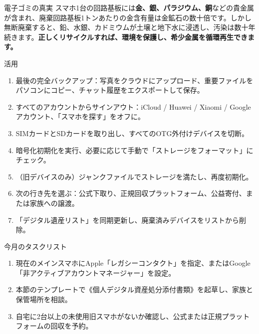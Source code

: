\begin{tcbinfo}{電子ゴミの真実}
スマホ1台の回路基板には\textbf{金、銀、パラジウム、銅}などの貴金属が含まれ、廃棄回路基板1トンあたりの金含有量は金鉱石の数十倍です。しかし無断廃棄すると、鉛、水銀、カドミウムが土壌と地下水に浸透し、汚染は数十年続きます。\textbf{正しくリサイクルすれば、環境を保護し、希少金属を循環再生できます。}

\end{tcbinfo}

\begin{tcbpractice}{活用}
\begin{enumerate}
  \item 最後の完全バックアップ：写真をクラウドにアップロード、重要ファイルをパソコンにコピー、チャット履歴をエクスポートして保存。
  \item すべてのアカウントからサインアウト：iCloud / Huawei / Xiaomi / Googleアカウント、「スマホを探す」をオフに。
  \item SIMカードとSDカードを取り出し、すべてのOTG外付けデバイスを切断。
  \item 暗号化初期化を実行、必要に応じて手動で「ストレージをフォーマット」にチェック。
  \item （旧デバイスのみ）ジャンクファイルでストレージを満たし、再度初期化。
  \item 次の行き先を選ぶ：公式下取り、正規回収プラットフォーム、公益寄付、または家族への譲渡。
  \item 「デジタル遺産リスト」を同期更新し、廃棄済みデバイスをリストから削除。
\end{enumerate}

\end{tcbpractice}

\begin{tcbpractice}{今月のタスクリスト}
\begin{enumerate}
  \item 現在のメインスマホにApple「レガシーコンタクト」を指定、またはGoogle「非アクティブアカウントマネージャー」を設定。
  \item 本節のテンプレートで《個人デジタル資産処分添付書類》を起草し、家族と保管場所を相談。
  \item 自宅に2台以上の未使用旧スマホがないか確認し、公式または正規プラットフォームの回収を予約。
\end{enumerate}

\end{tcbpractice}
